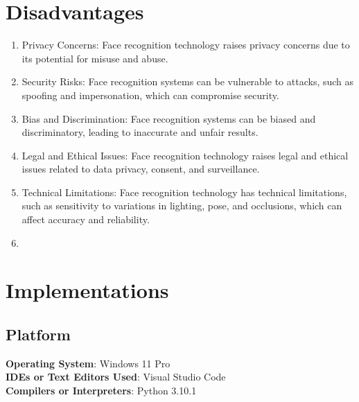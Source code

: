 \documentclass[openany]{report}
\begin{document}
\section{Disadvantages}

\begin{enumerate}
    \item Privacy Concerns: Face recognition technology raises privacy concerns due to its potential for misuse and abuse.
    \item Security Risks: Face recognition systems can be vulnerable to attacks, such as spoofing and impersonation, which can compromise security.
    \item Bias and Discrimination: Face recognition systems can be biased and discriminatory, leading to inaccurate and unfair results.
    \item Legal and Ethical Issues: Face recognition technology raises legal and ethical issues related to data privacy, consent, and surveillance.
    \item Technical Limitations: Face recognition technology has technical limitations, such as sensitivity to variations in lighting, pose, and occlusions, which can affect accuracy and reliability.\item
\end{enumerate}
\section{Implementations}

\subsection{Platform}
\textbf{Operating System}: Windows 11 Pro\\
\textbf{IDEs or Text Editors Used}: Visual Studio Code\\
\textbf{Compilers or Interpreters}: Python 3.10.1\\
\end{document}
